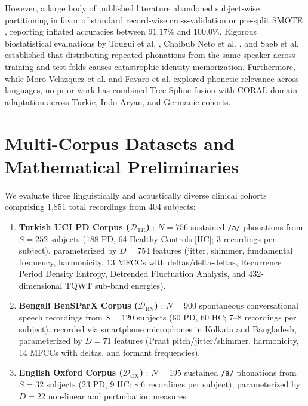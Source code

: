 \documentclass[journal,10pt,twoside]{IEEEtran}
\begin{document}
However, a large body of published literature abandoned subject-wise partitioning in favor of standard record-wise cross-validation or pre-split SMOTE \cite{ref23,ref24,ref25,ref26,ref27,ref28,ref29,ref30,ref31,ref32}, reporting inflated accuracies between $91.17\%$ and $100.0\%$. Rigorous biostatistical evaluations by Tougui et al. \cite{ref33}, Chaibub Neto et al. \cite{ref34}, and Saeb et al. \cite{ref35} established that distributing repeated phonations from the same speaker across training and test folds causes catastrophic identity memorization. Furthermore, while Moro-Velazquez et al. \cite{ref36,ref37} and Favaro et al. \cite{ref38,ref39} explored phonetic relevance across languages, no prior work has combined Tree-Spline fusion with CORAL domain adaptation across Turkic, Indo-Aryan, and Germanic cohorts.

\section{Multi-Corpus Datasets and Mathematical Preliminaries}
We evaluate three linguistically and acoustically diverse clinical cohorts comprising 1,851 total recordings from 404 subjects:
\begin{enumerate}
    \item \textbf{Turkish UCI PD Corpus ($\mathcal{D}_{\text{TR}}$)} \cite{ref1}: $N = 756$ sustained \texttt{/a/} phonations from $S = 252$ subjects (188 PD, 64 Healthy Controls [HC]; 3 recordings per subject), parameterized by $D = 754$ features (jitter, shimmer, fundamental frequency, harmonicity, 13 MFCCs with deltas/delta-deltas, Recurrence Period Density Entropy, Detrended Fluctuation Analysis, and 432-dimensional TQWT sub-band energies).
    \item \textbf{Bengali BenSParX Corpus ($\mathcal{D}_{\text{BN}}$)} \cite{ref5}: $N = 900$ spontaneous conversational speech recordings from $S = 120$ subjects (60 PD, 60 HC; 7--8 recordings per subject), recorded via smartphone microphones in Kolkata and Bangladesh, parameterized by $D = 71$ features (Praat pitch/jitter/shimmer, harmonicity, 14 MFCCs with deltas, and formant frequencies).
    \item \textbf{English Oxford Corpus ($\mathcal{D}_{\text{OX}}$)} \cite{ref3}: $N = 195$ sustained \texttt{/a/} phonations from $S = 32$ subjects (23 PD, 9 HC; $\sim 6$ recordings per subject), parameterized by $D = 22$ non-linear and perturbation measures.
\end{enumerate}
\end{document}
